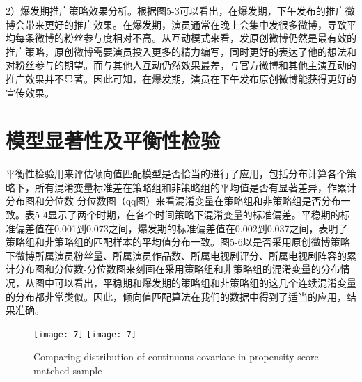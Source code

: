 2）爆发期推广策略效果分析。根据图5-3可以看出，在爆发期，下午发布的推广微博会带来更好的推广效果。在爆发期，演员通常在晚上会集中发很多微博，导致平均每条微博的粉丝参与度相对不高。从互动模式来看，发原创微博仍然是最有效的推广策略，原创微博需要演员投入更多的精力编写，同时更好的表达了他的想法和对粉丝参与的期望。而与其他人互动仍然效果最差，与官方微博和其他主演互动的推广效果并不显著。因此可知，在爆发期，演员在下午发布原创微博能获得更好的宣传效果。

\section{模型显著性及平衡性检验}
平衡性检验用来评估倾向值匹配模型是否恰当的进行了应用，包括分布计算各个策略下，所有混淆变量标准差在策略组和非策略组的平均值是否有显著差异，作累计分布图和分位数-分位数图（qq图）来看混淆变量在策略组和非策略组是否分布一致。表5-4显示了两个时期，在各个时间策略下混淆变量的标准偏差。平稳期的标准偏差值在0.001到0.073之间，爆发期的标准偏差值在0.002到0.037之间，表明了策略组和非策略组的匹配样本的平均值分布一致。图5-6以是否采用原创微博策略下微博所属演员粉丝量、所属演员作品数、所属电视剧评分、所属电视剧阵容的累计分布图和分位数-分位数图来刻画在采用策略组和非策略组的混淆变量的分布情况，从图中可以看出，平稳期和爆发期的策略组和非策略组的这几个连续混淆变量的分布都非常类似。因此，倾向值匹配算法在我们的数据中得到了适当的应用，结果准确。


\begin{figure}[h]
  \centering%
    {\texttt{[image: 7]}}
    {\texttt{[image: 7]}}
\caption{Comparing distribution of continuous covariate in propensity-score matched sample}
\end{figure}


